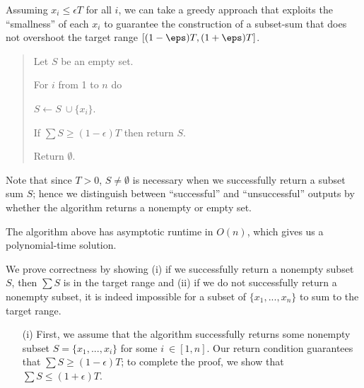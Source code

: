 \documentclass{article}
\begin{document}
\begin{solution}
Assuming $x_i \leq \epsilon T$ for all $i$, we can take a greedy approach that exploits the ``smallness'' of each $x_i$ to guarantee the construction of a subset-sum that does not overshoot the target range $[( 1-\eps )T , ( 1+\eps )T ]$.

\begin{quote}%

\begin{steps}
    \item Let $S$ be an empty set.
    \item For $i$ from 1 to $n$ do
    \begin{steps}
        \item $S \leftarrow S \ \cup \{x_i\}$.
        \item If $\sum S \geq (1 - \epsilon) T$ then return $S$.
    \end{steps}
    \item Return $\emptyset$.
\end{steps}
\end{quote}
Note that since $T > 0$, $S \not= \emptyset$ is necessary when we successfully return a subset sum $S$; hence we distinguish between ``successful'' and ``unsuccessful'' outputs by whether the algorithm returns a nonempty or empty set.

\begin{subproof} [Runtime]
The algorithm above has asymptotic runtime in $O(n)$, which gives us a polynomial-time solution.
\end{subproof}

\vspace{-0.7cc}
\begin{subproof} [Correctness]
We prove correctness by showing (i) if we successfully return a nonempty subset $S$, then $\sum S$ is in the target range and (ii) if we do not successfully return a nonempty subset, it is indeed impossible for a subset of $\{x_1, ..., x_n\}$ to sum to the target range.
\begin{enumerate}
    \item [(i)] First, we assume that the algorithm successfully returns some nonempty subset $S = \{x_1, ..., x_i\}$ for some $i \ \in [1,n]$. Our return condition guarantees that $\sum S \geq (1 - \epsilon) T$; to complete the proof, we show that $\sum S \leq (1 + \epsilon) T$.


\end{enumerate}
\end{subproof}
\end{solution}
\end{document}
